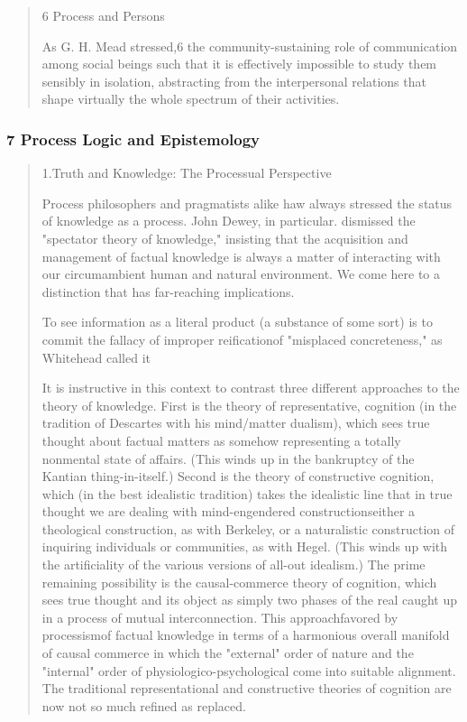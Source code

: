 \documentclass[a4paper]{Thesis}
\begin{document}
	\begin{quotation}
		6
		Process and Persons
		
		As
		G. H. Mead stressed,6 the community-sustaining role of communication among social
		beings such that it is effectively impossible to study them sensibly in isolation, abstracting
		from the interpersonal relations that shape virtually the whole spectrum of their activities.
	\end{quotation}
	
	\subsubsection{7 Process Logic and Epistemology}
	\begin{quotation}
		
		1.Truth and Knowledge: The Processual Perspective
		
		Process philosophers and pragmatists alike
		haw always stressed the status of knowledge as a process. John Dewey, in particular.
		dismissed the "spectator theory of knowledge," insisting that the acquisition and
		management of factual knowledge is always a matter of interacting with our
		circumambient human and natural environment. We come here to a distinction that has
		far-reaching implications.
		
		To see
		information as a literal product (a substance of some sort) is to commit the fallacy of
		improper reificationof "misplaced concreteness," as Whitehead called it
		
		It is instructive in this context to contrast three different approaches to the theory of
		knowledge. 
		First is the theory of representative, cognition (in the tradition of Descartes
		with his mind/matter dualism), which sees true thought about factual matters as
		somehow representing a totally nonmental state of affairs. (This winds up in the
		bankruptcy of the Kantian thing-in-itself.) 
		Second is the theory of constructive cognition,
		which (in the best idealistic tradition) takes the idealistic line that in true thought we are
		dealing with mind-engendered constructionseither a theological construction, as with
		Berkeley, or a naturalistic construction of inquiring individuals or communities, as with Hegel. (This winds up with the artificiality of the various versions of all-out
		idealism.) 
		The prime remaining possibility is the causal-commerce theory of cognition,
		which sees true thought and its object as simply two phases of the real caught up in a
		process of mutual interconnection. This approachfavored by processismof factual
		knowledge in terms of a harmonious overall manifold of causal commerce in which the
		"external" order of nature and the "internal" order of physiologico-psychological come into
		suitable alignment. The traditional representational and constructive theories of cognition
		are now not so much refined as replaced.
	\end{quotation}
	
\end{document}
